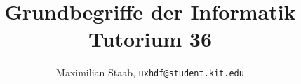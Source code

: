 \ifdefined\compileall

\begin{frame}\vfill\centering \huge{} \vfill\end{frame}

\else
\ifdefined\compiletype
	\documentclass[handout]{beamer}
\else
	\documentclass{beamer}
	\def\compiletype{livebeamer}
\fi

\usepackage{templates/beamerthemekitwide}



\title[Grundbegriffe der Informatik]{Grundbegriffe der Informatik\\Tutorium 36}
\date{\tutdate}
\subtitle{}
\author{Maximilian Staab, \texttt{uxhdf@student.kit.edu}}



\institute{}






%


	


\begin{frame}
	\titlepage
\end{frame}

\ifdefined\printmode
	\ifdefined\compileall \else
	\begin{frame}{Gliederung}
		\tableofcontents
	\end{frame}
\fi\fi

\fi